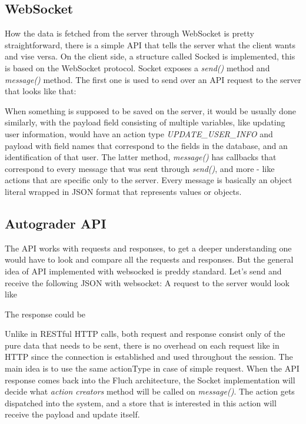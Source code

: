 \subsection{WebSocket}\label{sec:websocket}
How the data is fetched from the server through WebSocket is pretty straightforward, there is a simple API that tells the server what the client wants and vise versa. On the client side, a structure called Socked is implemented, this is based on the WebSocket protocol. Socket exposes a \emph{send()} method and \emph{message()} method. The first one is used to send over an API request to the server that looks like that:

When something is supposed to be saved on the server, it would be usually done similarly, with the payload field consisting of multiple variables, like updating user information, would have an action type \emph{UPDATE\_USER\_INFO} and payload with field names that correspond to the fields in the database, and an identification of that user. The latter method, \emph{message()} has callbacks that correspond to every message that was sent through \emph{send()}, and more - like actions that are specific only to the server. Every message is basically an object literal wrapped in JSON format that represents values or objects.
\subsection{Autograder API}
The API works with requests and responses, to get a deeper understanding one would have to look and compare all the requests and responses. But the general idea of API implemented with websocked is preddy standard. Let's send and receive the following JSON with websocket:
A request to the server would look like 

The response could be

Unlike in RESTful HTTP calls, both request and response consist only of the pure data that needs to be sent, there is no overhead on each request like in HTTP since the connection is established and used throughout the session. The main idea is to use the same actionType in case of simple request. When the API response comes back into the Fluch architecture, the Socket implementation will decide what \emph{action creators} method will be called on \emph{message()}. The action gets dispatched into the system, and a store that is interested in this action will receive the payload and update itself.

